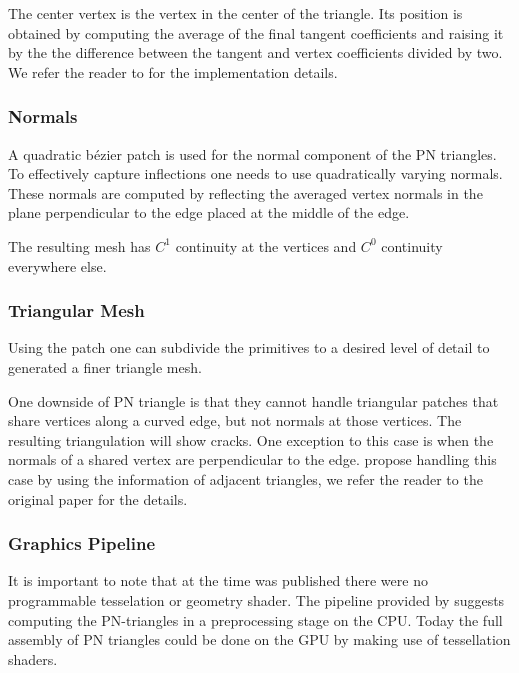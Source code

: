 The center vertex is the vertex in the center of the triangle. Its position is obtained by computing the average of the final tangent coefficients and raising it by the the difference between the tangent and vertex coefficients divided by two. We refer the reader to \textcite{vlachos2001curved} for the implementation details.

\subsubsection*{Normals}
A quadratic b\'ezier patch is used for the normal component of the PN triangles. To effectively capture inflections one needs to use quadratically varying normals. These normals are computed by reflecting the averaged vertex normals in the plane perpendicular to the edge placed at the middle of the edge.

The resulting mesh has $C^1$ continuity at the vertices and $C^0$ continuity everywhere else. 

\subsubsection*{Triangular Mesh}
Using the patch one can subdivide the primitives to a desired level of detail to generated a finer triangle mesh. 

One downside of PN triangle is that they cannot handle triangular patches that share vertices along a curved edge, but not normals at those vertices. The resulting triangulation will show cracks. One exception to this case is when the normals of a shared vertex are perpendicular to the edge. \citeauthor{vlachos2001curved} propose handling this case by using the information of adjacent triangles, we refer the reader to the original paper for the details.

\subsubsection*{Graphics Pipeline}
It is important to note that at the time \textcite{vlachos2001curved} was published there were no programmable tesselation or geometry shader. The pipeline provided by \citeauthor{vlachos2001curved} suggests computing the PN-triangles in a preprocessing stage on the CPU. Today the full assembly of PN triangles could be done on the GPU by making use of tessellation shaders.\\

